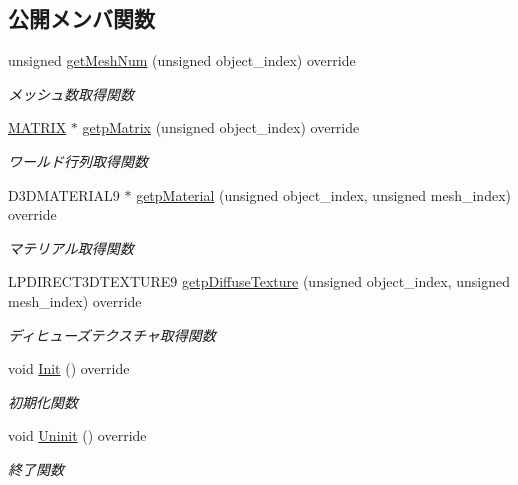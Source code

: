 \subsection*{公開メンバ関数}
\begin{DoxyCompactItemize}
\item 
unsigned \mbox{\hyperlink{class_coin_draw_a8ebedf2582d53b40016ebd3f0e82c38e}{get\+Mesh\+Num}} (unsigned object\+\_\+index) override
\begin{DoxyCompactList}\small\item\em メッシュ数取得関数 \end{DoxyCompactList}\item 
\mbox{\hyperlink{_matrix_8h_a032295cd9fb1b711757c90667278e744}{M\+A\+T\+R\+IX}} $\ast$ \mbox{\hyperlink{class_coin_draw_ad8cbbe87f4cf4428214f50492c731f5f}{getp\+Matrix}} (unsigned object\+\_\+index) override
\begin{DoxyCompactList}\small\item\em ワールド行列取得関数 \end{DoxyCompactList}\item 
D3\+D\+M\+A\+T\+E\+R\+I\+A\+L9 $\ast$ \mbox{\hyperlink{class_coin_draw_ad62dd6a9dd468342849a0c6ad5f8a5dd}{getp\+Material}} (unsigned object\+\_\+index, unsigned mesh\+\_\+index) override
\begin{DoxyCompactList}\small\item\em マテリアル取得関数 \end{DoxyCompactList}\item 
L\+P\+D\+I\+R\+E\+C\+T3\+D\+T\+E\+X\+T\+U\+R\+E9 \mbox{\hyperlink{class_coin_draw_a38a4143f2e93a5b16d33ec94a188f4f6}{getp\+Diffuse\+Texture}} (unsigned object\+\_\+index, unsigned mesh\+\_\+index) override
\begin{DoxyCompactList}\small\item\em ディヒューズテクスチャ取得関数 \end{DoxyCompactList}\item 
void \mbox{\hyperlink{class_coin_draw_ad0f5da5cfb896541fd59b1ab4a8593d1}{Init}} () override
\begin{DoxyCompactList}\small\item\em 初期化関数 \end{DoxyCompactList}\item 
void \mbox{\hyperlink{class_coin_draw_a6484c22a5598e298f18e7cd6083cd551}{Uninit}} () override
\begin{DoxyCompactList}\small\item\em 終了関数 \end{DoxyCompactList}\item 

\end{DoxyCompactItemize}
